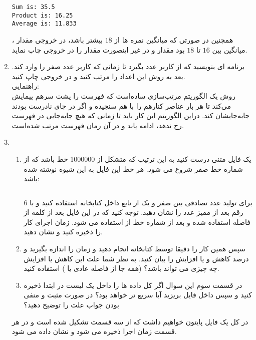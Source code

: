 \documentclass[oneside]{article}
\newcommand{\inputcode}[2]{\inputminted[mathescape,%
                                                 linenos=true,%
                                                 formatcom=\small\setstretch{1}]{#1}{#2}}%
\begin{document}
\begin{enumerate}
\begin{latin}
\texttt{Sum is: 35.5 }\\
\texttt{Product is: 16.25 }\\
\texttt{Average is: 11.833}
\end{latin}
همچنین در صورتی که میانگین نمره ها از $18$ بیشتر باشد، در خروجی مقدار ، میانگین بین $16$ تا 
$18$
بود مقدار 
و در غیر اینصورت مقدار
را در خروجی چاپ نماید.
\item
	برنامه ای بنویسید که از کاربر عدد بگیرد تا زمانی که کاربر عدد صفر را وارد کند. بعد به روش
  این اعداد را مرتب کنید و در خروجی چاپ کنید. 
  \\
راهنمایی:
\\
روش
یک الگوریتم مرتب‌سازی ساده‌است که فهرست را پشت سرهم پیمایش می‌کند تا هر بار عناصر کنارهم را با هم سنجیده و اگر در جای نادرست بودند جابه‌جایشان کند. دراین الگوریتم این کار باید تا زمانی که هیچ جابه‌جایی در فهرست رخ ندهد، ادامه یابد و در آن زمان فهرست مرتب شده‌است.
\item
\begin{enumerate}
\item
یک فایل متنی درست کنید به این ترتیب که متشکل از 
\num{1000000}
 خط باشد که از شماره خط صفر شروع می شود. هر خط این فایل به این شیوه نوشته شده باشد:
\begin{latin}\inputcode{Text}{random.txt}\end{latin}
برای تولید عدد تصادفی بین صفر و یک از تابع 
داخل کتابخانه
استفاده کنید و با 6 رقم بعد از ممیز عدد را نشان دهید. توجه کنید که در این فایل بعد از کلمه
از فاصله استفاده شده و بعد از شماره خط از 
استفاده می شود. زمان اجرای کار را ذخیره کنید و نشان دهید. 
\item
سپس همین کار را دقیقا توسط کتابخانه 
انجام دهید و زمان را اندازه بگیرید و درصد کاهش و یا افزایش را بیان کنید. به نظر شما علت این کاهش یا افزایش چه چیزی می تواند باشد؟ (همه جا از فاصله عادی یا
)
استفاده کنید.
\item
در قسمت سوم این سوال اگر کل داده ها را داخل یک لیست در ابتدا ذخیره کنید و سپس داخل فایل بریزید آیا سریع تر خواهد بود؟ در صورت مثبت و منفی بودن جواب علت را توضیح دهید؟
\end{enumerate}
در کل یک فایل پایتون خواهیم داشت که از سه قسمت تشکیل شده است و در هر قسمت زمان اجرا ذخیره می شود و نشان داده می شود.


\end{enumerate}
\end{document}
